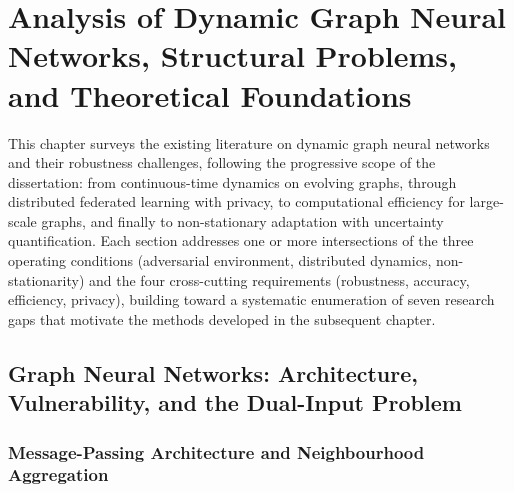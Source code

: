
\chapter{Analysis of Dynamic Graph Neural Networks, Structural Problems, and Theoretical Foundations}
\label{ch:literature}

This chapter surveys the existing literature on dynamic graph neural networks and their robustness challenges, following the progressive scope of the dissertation: from continuous-time dynamics on evolving graphs, through distributed federated learning with privacy, to computational efficiency for large-scale graphs, and finally to non-stationary adaptation with uncertainty quantification. Each section addresses one or more intersections of the three operating conditions (adversarial environment, distributed dynamics, non-stationarity) and the four cross-cutting requirements (robustness, accuracy, efficiency, privacy), building toward a systematic enumeration of seven research gaps that motivate the methods developed in the subsequent chapter.


\section{Graph Neural Networks: Architecture, Vulnerability, and the Dual-Input Problem}
\label{sec:gnn_vulnerability}

\subsection{Message-Passing Architecture and Neighbourhood Aggregation}

